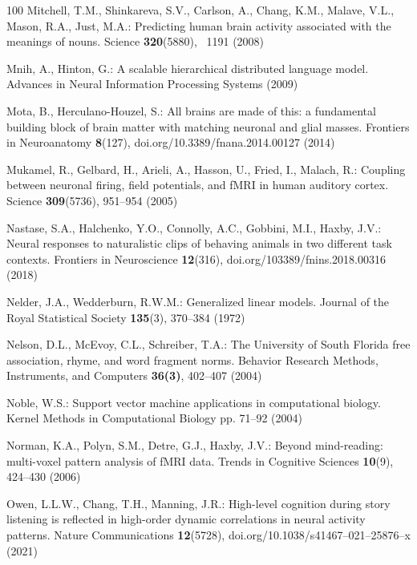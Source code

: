 \documentclass[runningheads]{llncs}
\begin{document}
\begin{thebibliography}{100}
Mitchell, T.M., Shinkareva, S.V., Carlson, A., Chang, K.M., Malave, V.L.,
  Mason, R.A., Just, M.A.: Predicting human brain activity associated with the
  meanings of nouns. Science  \textbf{320}(5880), ~1191 (2008)

Mnih, A., Hinton, G.: A scalable hierarchical distributed language model.
  Advances in Neural Information Processing Systems  (2009)

Mota, B., Herculano-Houzel, S.: All brains are made of this: a fundamental
  building block of brain matter with matching neuronal and glial masses.
  Frontiers in Neuroanatomy  \textbf{8}(127),  doi.org/10.3389/fnana.2014.00127
  (2014)

Mukamel, R., Gelbard, H., Arieli, A., Hasson, U., Fried, I., Malach, R.:
  Coupling between neuronal firing, field potentials, and {fMRI} in human
  auditory cortex. Science  \textbf{309}(5736),  951--954 (2005)

Nastase, S.A., Halchenko, Y.O., Connolly, A.C., Gobbini, M.I., Haxby, J.V.:
  Neural responses to naturalistic clips of behaving animals in two different
  task contexts. Frontiers in Neuroscience  \textbf{12}(316),
  doi.org/103389/fnins.2018.00316 (2018)

Nelder, J.A., Wedderburn, R.W.M.: Generalized linear models. Journal of the
  Royal Statistical Society  \textbf{135}(3),  370--384 (1972)

Nelson, D.L., McEvoy, C.L., Schreiber, T.A.: The {U}niversity of {S}outh
  {F}lorida free association, rhyme, and word fragment norms. Behavior Research
  Methods, Instruments, and Computers  \textbf{36(3)},  402--407 (2004)

Noble, W.S.: Support vector machine applications in computational biology.
  Kernel Methods in Computational Biology pp. 71--92 (2004)

Norman, K.A., Polyn, S.M., Detre, G.J., Haxby, J.V.: Beyond mind-reading:
  multi-voxel pattern analysis of {fMRI} data. Trends in Cognitive Sciences
  \textbf{10}(9),  424--430 (2006)

Owen, L.L.W., Chang, T.H., Manning, J.R.: High-level cognition during story
  listening is reflected in high-order dynamic correlations in neural activity
  patterns. Nature Communications  \textbf{12}(5728),
  doi.org/10.1038/s41467--021--25876--x (2021)


\end{thebibliography}
\end{document}
